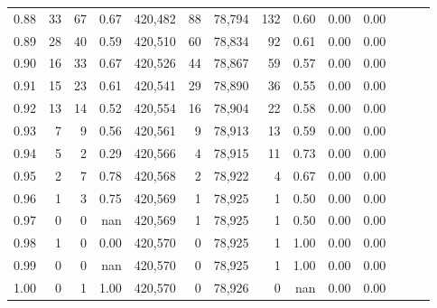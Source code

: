 \begin{tabular}{rrrrrrrrrrrrrr}
0.88 &      33 &     67 &  0.67 &  420,482 &       88 &  78,794 &     132 &  0.60 &  0.00 &      0.00 \\
0.89 &      28 &     40 &  0.59 &  420,510 &       60 &  78,834 &      92 &  0.61 &  0.00 &      0.00 \\
0.90 &      16 &     33 &  0.67 &  420,526 &       44 &  78,867 &      59 &  0.57 &  0.00 &      0.00 \\
0.91 &      15 &     23 &  0.61 &  420,541 &       29 &  78,890 &      36 &  0.55 &  0.00 &      0.00 \\
0.92 &      13 &     14 &  0.52 &  420,554 &       16 &  78,904 &      22 &  0.58 &  0.00 &      0.00 \\
0.93 &       7 &      9 &  0.56 &  420,561 &        9 &  78,913 &      13 &  0.59 &  0.00 &      0.00 \\
0.94 &       5 &      2 &  0.29 &  420,566 &        4 &  78,915 &      11 &  0.73 &  0.00 &      0.00 \\
0.95 &       2 &      7 &  0.78 &  420,568 &        2 &  78,922 &       4 &  0.67 &  0.00 &      0.00 \\
0.96 &       1 &      3 &  0.75 &  420,569 &        1 &  78,925 &       1 &  0.50 &  0.00 &      0.00 \\
0.97 &       0 &      0 &   nan &  420,569 &        1 &  78,925 &       1 &  0.50 &  0.00 &      0.00 \\
0.98 &       1 &      0 &  0.00 &  420,570 &        0 &  78,925 &       1 &  1.00 &  0.00 &      0.00 \\
0.99 &       0 &      0 &   nan &  420,570 &        0 &  78,925 &       1 &  1.00 &  0.00 &      0.00 \\
1.00 &       0 &      1 &  1.00 &  420,570 &        0 &  78,926 &       0 &   nan &  0.00 &      0.00 \\
\bottomrule
\end{tabular}
